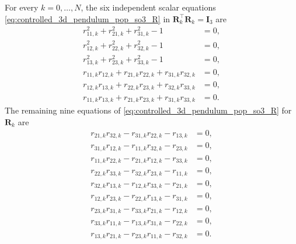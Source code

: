 For every \(k=0,\ldots,N\), the six independent scalar equations \eqref{eq:controlled_3d_pendulum_pop_so3_R} in
\(\bm{R}_k^{\top}\bm{R}_k=\bm{I}_3\) are
\begin{subequations}
\label{eq:app_3d_scalar_R_orthogonality}
\begin{align}
r_{11,k}^2+r_{21,k}^2+r_{31,k}^2-1&=0,\\
r_{12,k}^2+r_{22,k}^2+r_{32,k}^2-1&=0,\\
r_{13,k}^2+r_{23,k}^2+r_{33,k}^2-1&=0,\\
r_{11,k}r_{12,k}+r_{21,k}r_{22,k}+r_{31,k}r_{32,k}&=0,\\
r_{12,k}r_{13,k}+r_{22,k}r_{23,k}+r_{32,k}r_{33,k}&=0,\\
r_{11,k}r_{13,k}+r_{21,k}r_{23,k}+r_{31,k}r_{33,k}&=0.
\end{align}
\end{subequations}
The remaining nine equations of \eqref{eq:controlled_3d_pendulum_pop_so3_R} for \(\bm{R}_k\) are
\begin{subequations}
\label{eq:app_3d_scalar_R_right_handedness}
\begin{align}
r_{21,k}r_{32,k}-r_{31,k}r_{22,k}-r_{13,k}&=0,\\
r_{31,k}r_{12,k}-r_{11,k}r_{32,k}-r_{23,k}&=0,\\
r_{11,k}r_{22,k}-r_{21,k}r_{12,k}-r_{33,k}&=0,\\
r_{22,k}r_{33,k}-r_{32,k}r_{23,k}-r_{11,k}&=0,\\
r_{32,k}r_{13,k}-r_{12,k}r_{33,k}-r_{21,k}&=0,\\
r_{12,k}r_{23,k}-r_{22,k}r_{13,k}-r_{31,k}&=0,\\
r_{23,k}r_{31,k}-r_{33,k}r_{21,k}-r_{12,k}&=0,\\
r_{33,k}r_{11,k}-r_{13,k}r_{31,k}-r_{22,k}&=0,\\
r_{13,k}r_{21,k}-r_{23,k}r_{11,k}-r_{32,k}&=0.
\end{align}
\end{subequations}

